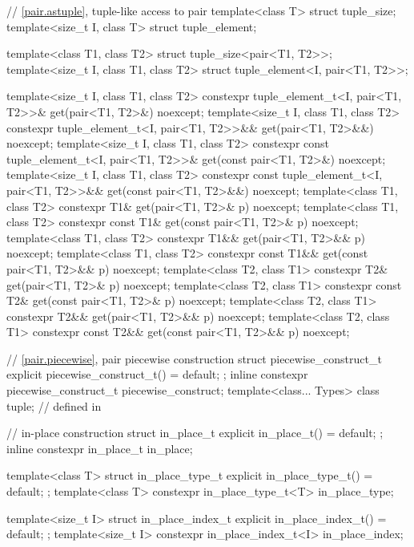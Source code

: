 \begin{codeblock}
{  // \ref{pair.astuple}, tuple-like access to pair
  template<class T> struct tuple_size;
  template<size_t I, class T> struct tuple_element;

  template<class T1, class T2> struct tuple_size<pair<T1, T2>>;
  template<size_t I, class T1, class T2> struct tuple_element<I, pair<T1, T2>>;

  template<size_t I, class T1, class T2>
    constexpr tuple_element_t<I, pair<T1, T2>>& get(pair<T1, T2>&) noexcept;
  template<size_t I, class T1, class T2>
    constexpr tuple_element_t<I, pair<T1, T2>>&& get(pair<T1, T2>&&) noexcept;
  template<size_t I, class T1, class T2>
    constexpr const tuple_element_t<I, pair<T1, T2>>& get(const pair<T1, T2>&) noexcept;
  template<size_t I, class T1, class T2>
    constexpr const tuple_element_t<I, pair<T1, T2>>&& get(const pair<T1, T2>&&) noexcept;
  template<class T1, class T2>
    constexpr T1& get(pair<T1, T2>& p) noexcept;
  template<class T1, class T2>
    constexpr const T1& get(const pair<T1, T2>& p) noexcept;
  template<class T1, class T2>
    constexpr T1&& get(pair<T1, T2>&& p) noexcept;
  template<class T1, class T2>
    constexpr const T1&& get(const pair<T1, T2>&& p) noexcept;
  template<class T2, class T1>
    constexpr T2& get(pair<T1, T2>& p) noexcept;
  template<class T2, class T1>
    constexpr const T2& get(const pair<T1, T2>& p) noexcept;
  template<class T2, class T1>
    constexpr T2&& get(pair<T1, T2>&& p) noexcept;
  template<class T2, class T1>
    constexpr const T2&& get(const pair<T1, T2>&& p) noexcept;

  // \ref{pair.piecewise}, pair piecewise construction
  struct piecewise_construct_t {
    explicit piecewise_construct_t() = default;
  };
  inline constexpr piecewise_construct_t piecewise_construct{};
  template<class... Types> class tuple;         // defined in 

  // in-place construction%
%
%
%
%
%
  struct in_place_t {
    explicit in_place_t() = default;
  };
  inline constexpr in_place_t in_place{};

  template<class T>
    struct in_place_type_t {
      explicit in_place_type_t() = default;
    };
  template<class T> constexpr in_place_type_t<T> in_place_type{};

  template<size_t I>
    struct in_place_index_t {
      explicit in_place_index_t() = default;
    };
  template<size_t I> constexpr in_place_index_t<I> in_place_index{};

}
\end{codeblock}
